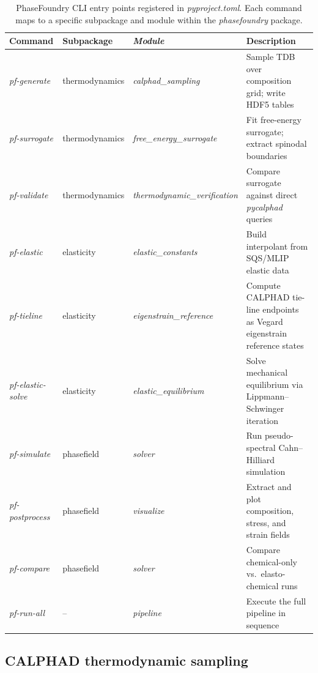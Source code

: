 \documentclass[12pt]{article}
\begin{document}
\begin{table}[H]
\centering
\caption{PhaseFoundry CLI entry points registered in \textit{pyproject.toml}. Each command maps to a specific subpackage and module within the \textit{phasefoundry} package.}
\label{tab:cli}
\scriptsize
\begin{tabular}{@{}ll>{\itshape}ll@{}}
\toprule
\textbf{Command} & \textbf{Subpackage} & \textbf{\upshape Module} & \textbf{Description} \\
\midrule
\textit{pf-generate}       & thermodynamics & calphad\_sampling           & Sample TDB over composition grid; write HDF5 tables \\
\textit{pf-surrogate}      & thermodynamics & free\_energy\_surrogate     & Fit free-energy surrogate; extract spinodal boundaries \\
\textit{pf-validate}       & thermodynamics & thermodynamic\_verification & Compare surrogate against direct \textit{pycalphad} queries \\
\textit{pf-elastic}        & elasticity     & elastic\_constants          & Build interpolant from SQS/MLIP elastic data \\
\textit{pf-tieline}        & elasticity     & eigenstrain\_reference      & Compute CALPHAD tie-line endpoints as Vegard eigenstrain reference states \\
\textit{pf-elastic-solve}  & elasticity     & elastic\_equilibrium        & Solve mechanical equilibrium via Lippmann--Schwinger iteration \\
\textit{pf-simulate}       & phasefield     & solver                      & Run pseudo-spectral Cahn--Hilliard simulation \\
\textit{pf-postprocess}    & phasefield     & visualize                   & Extract and plot composition, stress, and strain fields \\
\textit{pf-compare}        & phasefield     & solver                      & Compare chemical-only vs.\ elasto-chemical runs \\
\textit{pf-run-all}        & --             & pipeline                    & Execute the full pipeline in sequence \\
\bottomrule
\end{tabular}
\end{table}

\subsection{CALPHAD thermodynamic sampling}
\end{document}
